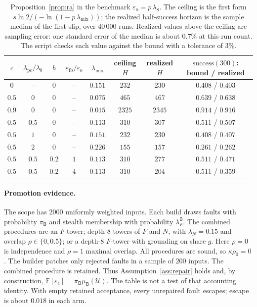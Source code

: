 \documentclass[11pt]{article}
\theoremstyle{definition}
\theoremstyle{remark}
\newcommand{\lN}{\lambda_N}
\newcommand{\lpc}{\lambda_{\mathrm{pc}}}
\newcommand{\lmix}{\lambda_{\mathrm{mix}}}
\newcommand{\eop}{\varepsilon_{\mathrm{o}}}
\newcommand{\ecl}{\varepsilon_{\mathrm{c}}}
\newcommand{\Bld}{\mathsf{B}}
\newcommand{\muB}{\mu_{\Bld}}
\newcommand{\piB}{\pi_{\Bld}}
\newcommand{\lFB}{\lambda_F^{\Bld}}
\begin{document}
\begin{table}[h]
\centering
\small
\begin{tabular}{cccccccc}
\toprule
$c$ & $\lpc/\lambda_8$ & $b$ & $\varepsilon_{\mathrm{fb}}/\eop$ & $\lmix$ & ceiling $H$ & realized $H$ &
$\mathrm{success}(300)$: bound / realized \\
\midrule
$0$   & --    & $0$   & --  & $0.151$ & $232$  & $230$  & $0.408$ / $0.403$ \\
$0.5$ & $0$   & $0$   & --  & $0.075$ & $465$  & $467$  & $0.639$ / $0.638$ \\
$0.9$ & $0$   & $0$   & --  & $0.015$ & $2325$ & $2345$ & $0.914$ / $0.916$ \\
$0.5$ & $0.5$ & $0$   & --  & $0.113$ & $310$  & $307$  & $0.511$ / $0.507$ \\
$0.5$ & $1$   & $0$   & --  & $0.151$ & $232$  & $230$  & $0.408$ / $0.407$ \\
$0.5$ & $2$   & $0$   & --  & $0.226$ & $155$  & $157$  & $0.261$ / $0.262$ \\
$0.5$ & $0.5$ & $0.2$ & $1$ & $0.113$ & $310$  & $277$  & $0.511$ / $0.471$ \\
$0.5$ & $0.5$ & $0.2$ & $4$ & $0.113$ & $310$  & $204$  & $0.511$ / $0.359$ \\
\bottomrule
\end{tabular}
\caption{Proposition~\ref{prop:ra} in the benchmark $\eop=p\,\lambda_8$. The ceiling is the first form
$s\ln2/(-\ln(1-p\,\lmix))$; the realized half-success horizon is the sample median of the first
slip, over $40\,000$ runs. Realized values above the ceiling are sampling error: one standard error of the median is about
$0.7\%$ at this run count. The script checks each value against the bound with a tolerance of $3\%$.}
\label{tab:simra}
\end{table}

\paragraph{Promotion evidence.}
The scope has $2000$ uniformly weighted inputs.
Each build draws faults with probability $\piB$ and stealth membership with probability $\lFB$.
The combined procedures are an $F$-tower; depth-$8$ towers of $F$ and $N$, with $\lN=0.15$
and overlap $\rho\in\{0,0.5\}$; or a depth-$8$ $F$-tower with grounding on share $g$.
Here $\rho=0$ is independence and $\rho=1$ maximal overlap.
All procedures are sound, so $\kappa\rho_0=0$.
The builder patches only rejected faults in a sample of $200$ inputs.
The combined procedure is retained. Thus Assumption~\ref{ass:repair} holds and, by construction,
$\mathbb{E}[\ecl]=\piB\muB(\mathcal{U})$.
The table is not a test of that accounting identity.
With empty retained acceptance, every unrepaired fault escapes; escape is about $0.018$ in each arm.
\end{document}
